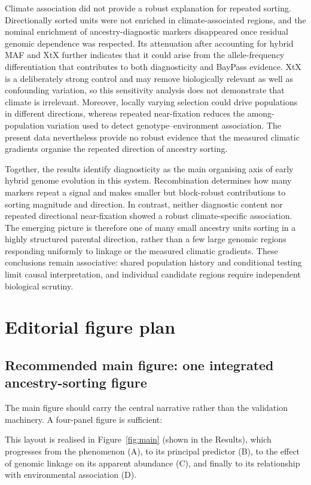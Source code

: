 \documentclass[11pt]{article}
\begin{document}
Climate association did not provide a robust explanation for repeated
sorting. Directionally sorted units were not enriched in climate-associated
regions, and the nominal enrichment of ancestry-diagnostic markers disappeared
once residual genomic dependence was respected. Its attenuation after
accounting for hybrid MAF and XtX further indicates that it could arise from
the allele-frequency differentiation that contributes to both diagnosticity
and BayPass evidence. XtX is a deliberately strong control and may remove
biologically relevant as well as confounding variation, so this sensitivity
analysis does not demonstrate that climate is irrelevant. Moreover, locally
varying selection could drive populations in different directions, whereas
repeated near-fixation reduces the among-population variation used to detect
genotype--environment association. The present data nevertheless provide no
robust evidence that the measured climatic gradients organise the repeated
direction of ancestry sorting.

Together, the results identify diagnosticity as the main organising axis of
early hybrid genome evolution in this system. Recombination determines how
many markers repeat a signal and makes smaller but block-robust contributions
to sorting magnitude and direction. In contrast, neither diagnostic content
nor repeated directional near-fixation showed a robust climate-specific
association. The emerging picture is therefore one of many small ancestry
units sorting in a highly structured parental direction, rather than a few
large genomic regions responding uniformly to linkage or the measured
climatic gradients. These conclusions remain associative: shared population
history and conditional testing limit causal interpretation, and individual
candidate regions require independent biological scrutiny.

\section*{Editorial figure plan}

\subsection*{Recommended main figure: one integrated ancestry-sorting figure}

The main figure should carry the central narrative rather than the validation
machinery. A four-panel figure is sufficient:

\noindent This layout is realised in Figure~\ref{fig:main} (shown in the Results),
which progresses from the phenomenon (A), to its principal predictor (B), to the
effect of genomic linkage on its apparent abundance (C), and finally to its
relationship with environmental association (D).
\end{document}
